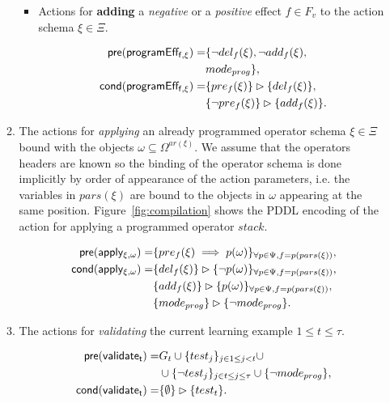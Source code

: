 \documentclass[letterpaper]{article} %
\newcommand{\pre}{\mathsf{pre}}     %
\newcommand{\cond}{\mathsf{cond}}   %
\begin{document}
\begin{itemize}
\begin{enumerate}
\begin{itemize}
\item Actions for {\bf adding} a {\em negative} or a {\em positive} effect $f\in F_v$ to the action schema $\xi\in\Xi$.

\begin{small}
\begin{align*}
\hspace*{7pt}\pre(\mathsf{programEff_{f,\xi}})=&\{\neg del_{f}(\xi),\neg add_{f}(\xi),\\
& mode_{prog}\},\\
\cond(\mathsf{programEff_{f,\xi}})=&\{pre_{f}(\xi)\}\rhd\{del_{f}(\xi)\},\\
&\{\neg pre_{f}(\xi)\}\rhd\{add_{f}(\xi)\}.
\end{align*}
\end{small}
\end{itemize}

\item The actions for {\em applying} an already programmed operator schema $\xi\in\Xi$ bound with the objects $\omega\subseteq\Omega^{ar(\xi)}$. We assume that the operators headers are known so the binding of the operator schema is done implicitly by order of appearance of the action parameters, i.e. the variables in $pars(\xi)$ are bound to the objects in $\omega$ appearing at the same position. Figure~\ref{fig:compilation} shows the PDDL encoding of the action for applying a programmed operator $stack$.
\begin{small}
\begin{align*}
\hspace*{7pt}\pre(\mathsf{apply_{\xi,\omega}})=&\{pre_{f}(\xi)\implies p(\omega)\}_{\forall p\in\Psi,f=p(pars(\xi))},\\
\cond(\mathsf{apply_{\xi,\omega}})=&\{del_{f}(\xi)\}\rhd\{\neg p(\omega)\}_{\forall p\in\Psi,f=p(pars(\xi))},\\
&\{add_{f}(\xi)\}\rhd\{p(\omega)\}_{\forall p\in\Psi,f=p(pars(\xi))},\\
&\{mode_{prog}\}\rhd\{\neg mode_{prog}\}.
\end{align*}
\end{small}

\item The actions for {\em validating} the current learning example {\tt\small $1\leq t\leq \tau$}.
\begin{small}
\begin{align*}
\hspace*{7pt}\pre(\mathsf{validate_{t}})=&G_t\cup\{test_j\}_{j\in 1\leq j<t}\cup\\
&\cup\{\neg test_j\}_{j\in t\leq j\leq \tau}\cup \{\neg mode_{prog}\},\\
\cond(\mathsf{validate_{t}})=&\{\emptyset\}\rhd\{test_t\}.
\end{align*}
\end{small}
\end{enumerate}
\end{itemize}
\end{document}
